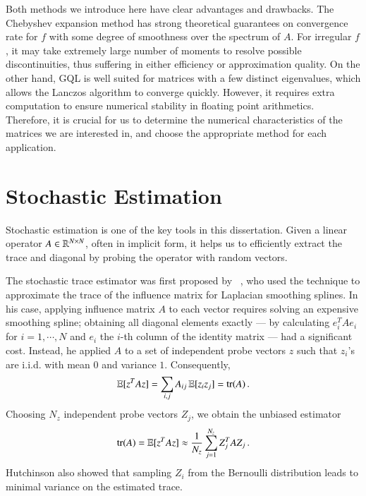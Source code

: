 Both methods we introduce here have clear advantages and drawbacks. The
Chebyshev expansion method has strong theoretical guarantees on convergence rate
for $f$ with some degree of smoothness over the spectrum of $A$. For irregular
$f$, it may take extremely large number of moments to resolve possible
discontinuities, thus suffering in either efficiency or approximation quality.
On the other hand, GQL is well suited for matrices with a few distinct
eigenvalues, which allows the Lanczos algorithm to converge quickly.
However, it requires extra computation to ensure numerical stability in floating
point arithmetics. Therefore, it is crucial for us to determine the numerical
characteristics of the matrices we are interested in, and choose the appropriate
method for each application.

\section{Stochastic Estimation}\label{pre:ste}

Stochastic estimation is one of the key tools in this dissertation. Given a
linear operator $A\in\mathbb{R}^{N\mathbin{\times} N}$, often in implicit form, it helps us to
efficiently extract the trace and diagonal by probing the operator with random
vectors. 

The stochastic trace estimator was first proposed by~
\citet{hutchinson1990stochastic}, who used the technique to approximate the
trace of the influence matrix for Laplacian smoothing splines. In his case,
applying influence matrix $A$ to each vector requires solving an expensive
smoothing spline; obtaining all diagonal elements exactly --- by calculating
$e_i^TAe_i$ for $i=1,\cdots, N$ and $e_i$ the $i$\hyp{}th column of the identity
matrix --- had a significant cost. Instead, he applied $A$ to a set of
independent probe vectors $z$ such that $z_i$'s are i.i.d. with mean $0$ and
variance $1$. Consequently, 
\begin{equation}\label{eq:probe_trace}
	\operatorname{\mathbb{E}}[z^TAz] = \sum_{i,j}A_{ij}\operatorname{\mathbb{E}}[z_iz_j] = \operatorname{tr}(A)\,.
\end{equation}
Choosing $N_z$ independent probe vectors $Z_j$, we obtain the unbiased estimator
\begin{equation}\label{eqn:trace_est}
	\operatorname{tr}(A) = \operatorname{\mathbb{E}}[z^TAz] \approx \frac{1}{N_z}\sum_{j=1}^{N_z}Z_j^TAZ_j\,.
\end{equation}
Hutchinson also showed that sampling $Z_i$ from the Bernoulli distribution
leads to minimal variance on the estimated trace.

